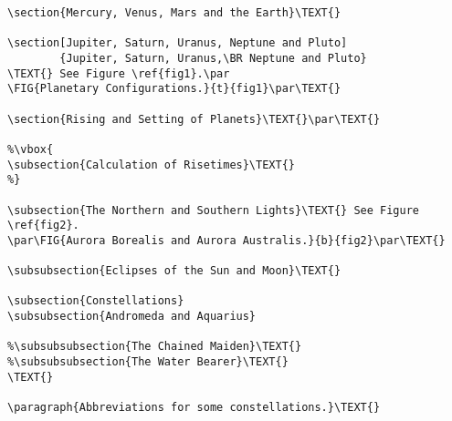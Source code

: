\begin{verbatim}
\section{Mercury, Venus, Mars and the Earth}\TEXT{}

\section[Jupiter, Saturn, Uranus, Neptune and Pluto]
        {Jupiter, Saturn, Uranus,\BR Neptune and Pluto}
\TEXT{} See Figure \ref{fig1}.\par
\FIG{Planetary Configurations.}{t}{fig1}\par\TEXT{}

\section{Rising and Setting of Planets}\TEXT{}\par\TEXT{}

%\vbox{
\subsection{Calculation of Risetimes}\TEXT{}
%}

\subsection{The Northern and Southern Lights}\TEXT{} See Figure \ref{fig2}.
\par\FIG{Aurora Borealis and Aurora Australis.}{b}{fig2}\par\TEXT{}

\subsubsection{Eclipses of the Sun and Moon}\TEXT{}

\subsection{Constellations}
\subsubsection{Andromeda and Aquarius}

%\subsubsubsection{The Chained Maiden}\TEXT{}
%\subsubsubsection{The Water Bearer}\TEXT{}
\TEXT{}

\paragraph{Abbreviations for some constellations.}\TEXT{}


\end{verbatim}

